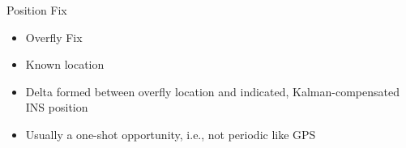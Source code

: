 \begin{frame}
Position Fix
 \begin{itemize}
 \item Overfly Fix
 \item Known location
 \item Delta formed between overfly location and indicated, Kalman-compensated INS position
 \item Usually a one-shot opportunity, i.e., not periodic like GPS
\end{itemize}
\end{frame}

